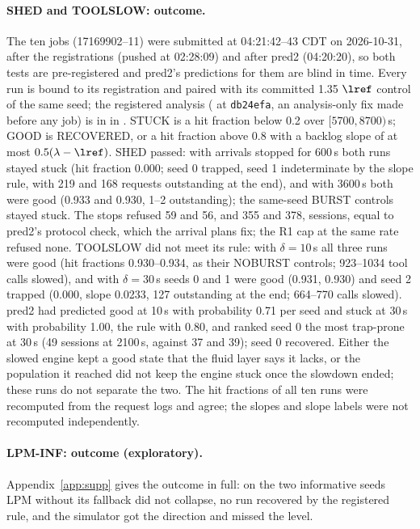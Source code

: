 \paragraph{SHED and TOOLSLOW: outcome.} The ten jobs (17169902--11) were submitted at 04:21:42--43 CDT on 2026-10-31, after the registrations (pushed at 02:28:09) and after pred2 (04:20:20), so both tests are pre-registered and pred2's predictions for them are blind in time. Every run is bound to its registration and paired with its committed 1.35 $\lref$ control of the same seed; the registered analysis ( at \texttt{db24efa}, an analysis-only fix made before any job) is in  in . STUCK is a hit fraction below 0.2 over $[5700,8700)$\,s; GOOD is RECOVERED, or a hit fraction above 0.8 with a backlog slope of at most $0.5(\lambda-\lref)$. SHED passed: with arrivals stopped for 600\,s both runs stayed stuck (hit fraction 0.000; seed 0 trapped, seed 1 indeterminate by the slope rule, with 219 and 168 requests outstanding at the end), and with 3600\,s both were good (0.933 and 0.930, 1--2 outstanding); the same-seed BURST controls stayed stuck. The stops refused 59 and 56, and 355 and 378, sessions, equal to pred2's protocol check, which the arrival plans fix; the R1 cap at the same rate refused none. TOOLSLOW did not meet its rule: with $\delta=10$\,s all three runs were good (hit fractions 0.930--0.934, as their NOBURST controls; 923--1034 tool calls slowed), and with $\delta=30$\,s seeds 0 and 1 were good (0.931, 0.930) and seed 2 trapped (0.000, slope 0.0233\sps, 127 outstanding at the end; 664--770 calls slowed). pred2 had predicted good at 10\,s with probability 0.71 per seed and stuck at 30\,s with probability 1.00, the rule with 0.80, and ranked seed 0 the most trap-prone at 30\,s (49 sessions at 2100\,s, against 37 and 39); seed 0 recovered. Either the slowed engine kept a good state that the fluid layer says it lacks, or the population it reached did not keep the engine stuck once the slowdown ended; these runs do not separate the two. The hit fractions of all ten runs were recomputed from the request logs and agree; the slopes and slope labels were not recomputed independently.

\paragraph{LPM-INF: outcome (exploratory).} Appendix~\ref{app:supp} gives the outcome in full: on the two informative seeds LPM without its fallback did not collapse, no run recovered by the registered rule, and the simulator got the direction and missed the level.
